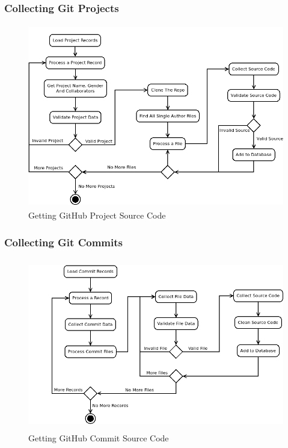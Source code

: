 \documentclass{article}
\begin{document}
\subsubsection{Collecting Git Projects}

\begin{figure}[!h]
    \centering
    \includegraphics[height=8cm]{diagrams/projects.png}
    \caption{Getting GitHub Project Source Code}
\end{figure}

\subsubsection{Collecting Git Commits}

\begin{figure}[!h]
    \centering
    \includegraphics[height=7.5cm]{diagrams/commits.png}
    \caption{Getting GitHub Commit Source Code}
\end{figure}


\end{document}
